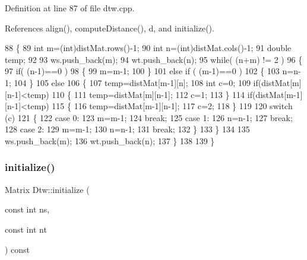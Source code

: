 Definition at line 87 of file dtw.\+cpp.



References align(), compute\+Distance(), d, and initialize().


\begin{DoxyCode}
88 \{
89     \textcolor{keywordtype}{int} m=(int)distMat.rows()-1;
90     \textcolor{keywordtype}{int} n=(int)distMat.cols()-1;
91     \textcolor{keywordtype}{double} temp;
92 
93     ws.push\_back(m);
94     wt.push\_back(n);
95     \textcolor{keywordflow}{while}( (n+m) != 2 )
96     \{
97         \textcolor{keywordflow}{if}( (n-1)==0 )
98         \{
99             m=m-1;
100         \}
101         \textcolor{keywordflow}{else} \textcolor{keywordflow}{if} ( (m-1)==0 )
102         \{
103             n=n-1;
104         \}
105         \textcolor{keywordflow}{else}
106         \{
107             temp=distMat[m-1][n];
108             \textcolor{keywordtype}{int} c=0;
109             \textcolor{keywordflow}{if}(distMat[m][n-1]<temp)
110             \{
111                 temp=distMat[m][n-1];
112                 c=1;
113             \}
114             \textcolor{keywordflow}{if}(distMat[m-1][n-1]<temp)
115             \{
116                 temp=distMat[m-1][n-1];
117                 c=2;
118             \}
119 
120             \textcolor{keywordflow}{switch} (c)
121             \{
122             \textcolor{keywordflow}{case} 0:
123                 m=m-1;
124                 \textcolor{keywordflow}{break};
125             \textcolor{keywordflow}{case} 1:
126                 n=n-1;
127                 \textcolor{keywordflow}{break};
128             \textcolor{keywordflow}{case} 2:
129                 m=m-1;
130                 n=n-1;
131                 \textcolor{keywordflow}{break};
132             \}
133         \}
134 
135         ws.push\_back(m);
136         wt.push\_back(n);
137     \}
138 
139 \}
\end{DoxyCode}
\mbox{\label{classassistive__rehab_1_1Dtw_a9b3ce7097b8646230f2f9a918126bbef}} 
\subsubsection{\texorpdfstring{initialize()}{initialize()}}
{\footnotesize\ttfamily Matrix Dtw\+::initialize (\begin{DoxyParamCaption}\item[{const int}]{ns,  }\item[{const int}]{nt }\end{DoxyParamCaption}) const\hspace{0.3cm}{\ttfamily [protected]}}



